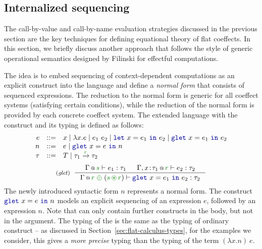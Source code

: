 
\subsection{Internalized sequencing}
\label{sec:flat-syntax-norm}

The call-by-value and call-by-name evaluation strategies discussed in the previous section are
the key techniques for defining equational theory of flat coeffects. In this section, we briefly 
discuss another approach that follows the style of generic operational semantics designed by Filinski
\cite{monads-inaction} for effectful computations.

The idea is to embed sequencing of context-dependent computations as an explicit construct into
the language and define a \emph{normal form} that consists of sequenced expressions. The reduction
to the normal form is generic for all coeffect systems (satisfying certain conditions), while the
reduction of the normal form is provided by each concrete coeffect system. The extended language
with the  construct and its typing is defined as follows:
%
\begin{equation*}
\begin{array}{rcl}
e &::=& x \sep \lambda x.e \sep e_1~e_2 \sep \kvd{let}~x = e_1~\kvd{in}~e_2 \sep \kvd{glet}~x = e_1~\kvd{in}~e_2\\
n &::=& e \sep \kvd{glet}~x=e~\kvd{in}~n\\
\tau &::=& T \sep \tau_1 \xrightarrow{\cclrd{r}} \tau_2
\end{array}
\end{equation*}
\begin{equation*}
\tyrule{glet}
  { \coctx{\Gamma}{\cclrd{s}} \vdash e_1 : \tau_1 &
    \coctx{\Gamma, x\!:\!\tau_1}{\cclrd{r}} \vdash e_2 : \tau_2 }
  { \coctx{\Gamma}{\cclrd{r}\;\cpar\;({\cclrd{s}\,\cseq\,\cclrd{r})}} \vdash \kvd{glet}~x=e_1~\kvd{in}~e_2 : \tau_2 }
\end{equation*}
%
The newly introduced syntactic form $n$ represents a normal form. The construct $\kvd{glet}~x=e~\kvd{in}~n$
models an explicit sequencing of an expression $e$, followed by an expression $n$. Note that  can 
only contain further  constructs in the body, but not in the argument. The typing of the 
is the same as the typing of ordinary  construct -- as discussed in Section~\ref{sec:flat-calculus-types},
for the examples we consider, this gives a \emph{more precise} typing than the typing of the
term $(\lambda x.n)~e$.

